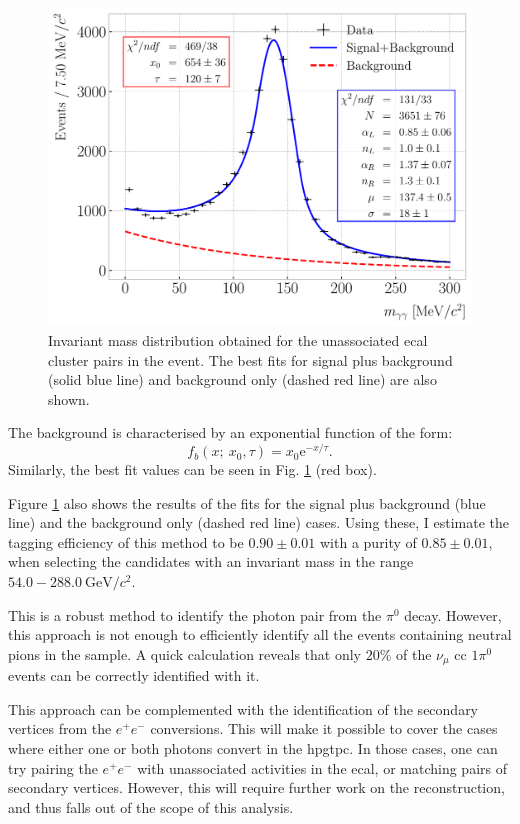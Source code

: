 \begin{figure}[t]
    \centering
    \includegraphics[width=.80\linewidth]{Images/GAr_selection/numuCC_1pizero_selection.pdf}
    \caption[Invariant mass distribution obtained for the unassociated \gls{ecal} cluster pairs in the event.]{Invariant mass distribution obtained for the unassociated \gls{ecal} cluster pairs in the event. The best fits for signal plus background (solid blue line) and background only (dashed red line) are also shown.}
    \label{fig:pizero_invariant_mass}
\end{figure}

The background is characterised by an exponential function of the form:
\begin{equation}
    f_{b} (x; ~x_{0}, \tau) = x_{0} \mathrm{e}^{-x/\tau}.
\end{equation}
Similarly, the best fit values can be seen in Fig. \ref{fig:pizero_invariant_mass} (red box).

Figure \ref{fig:pizero_invariant_mass} also shows the results of the fits for the signal plus background (blue line) and the background only (dashed red line) cases. Using these, I estimate the tagging efficiency of this method to be $0.90 \pm 0.01$ with a purity of $0.85 \pm 0.01$, when selecting the candidates with an invariant mass in the range $54.0-288.0~\mathrm{GeV}/c^{2}$.

This is a robust method to identify the photon pair from the $\pi^{0}$ decay. However, this approach is not enough to efficiently identify all the events containing neutral pions in the sample. A quick calculation reveals that only $20\%$ of the $\nu_{\mu}$ \gls{cc} $1\pi^{0}$ events can be correctly identified with it.

This approach can be complemented with the identification of the secondary vertices from the $e^{+}e^{-}$ conversions. This will make it possible to cover the cases where either one or both photons convert in the \gls{hpgtpc}. In those cases, one can try pairing the $e^{+}e^{-}$ with unassociated activities in the \gls{ecal}, or matching pairs of secondary vertices. However, this will require further work on the reconstruction, and thus falls out of the scope of this analysis.

